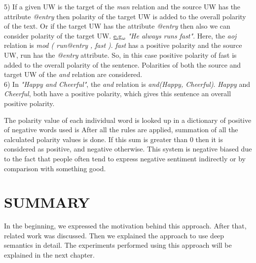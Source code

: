 5) If a given UW is the target of the \textit{man} relation and the source UW has the attribute \textit{@entry} then polarity of the target UW is added to the overall polarity of 
the text. Or if the target UW has the attribute \textit{@entry} then also we can consider polarity of the target UW. 
\underline{e.g.,} \textit{"He always runs fast"}. Here, the \textit{aoj} relation is \textit{mod ( run@entry , fast )}. \textit{fast} has a positive polarity and the source UW, run 
has the \textit{@entry} attribute. So, in this case positive polarity of fast is added to the overall polarity of the sentence.
Polarities of both the source and target UW of the \textit{and} relation are considered. \\
6) In \textit{"Happy and Cheerful"}, the \textit{and} relation is \textit{and(Happy, Cheerful)}. \textit{Happy} and \textit{Cheerful}, both have a positive
polarity, which gives this sentence an overall positive polarity.
 
The polarity value of each individual word is looked up in a dictionary of positive of negative words used is \citep*{liu2010sentiment} After all the rules are applied, summation of all the calculated polarity values is done. 
If this sum is greater than 0 then it is considered as positive, and negative otherwise. This system is negative biased due to the fact that people often tend to express negative sentiment 
indirectly or by comparison with something good.

\section*{SUMMARY}

In the beginning, we expressed the motivation behind this approach. After that, related work was discussed. Then we explained the approach to use deep semantics in detail.
The experiments performed using this approach will be explained in the next chapter.